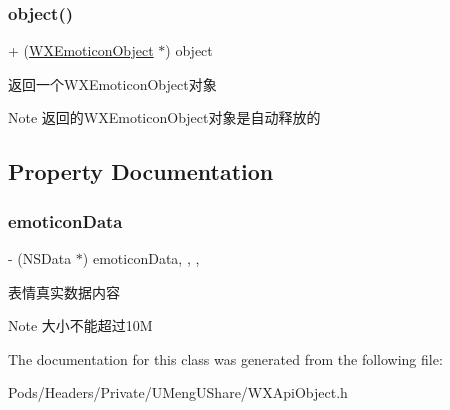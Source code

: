 \subsubsection{\texorpdfstring{object()}{object()}\hspace{0.1cm}{\footnotesize\ttfamily [3/3]}}
{\footnotesize\ttfamily + (\mbox{\hyperlink{interface_w_x_emoticon_object}{W\+X\+Emoticon\+Object}} $\ast$) object \begin{DoxyParamCaption}{ }\end{DoxyParamCaption}}



返回一个\+W\+X\+Emoticon\+Object对象 

\begin{DoxyNote}{Note}
返回的\+W\+X\+Emoticon\+Object对象是自动释放的 
\end{DoxyNote}


\subsection{Property Documentation}
\mbox{\label{interface_w_x_emoticon_object_a9a00b45ef65b19ff47a971b58123ace0}} 
\subsubsection{\texorpdfstring{emoticon\+Data}{emoticonData}}
{\footnotesize\ttfamily -\/ (N\+S\+Data $\ast$) emoticon\+Data\hspace{0.3cm}{\ttfamily [read]}, {\ttfamily [write]}, {\ttfamily [nonatomic]}, {\ttfamily [retain]}}

表情真实数据内容 \begin{DoxyNote}{Note}
大小不能超过10M 
\end{DoxyNote}


The documentation for this class was generated from the following file\+:\begin{DoxyCompactItemize}
\item 
Pods/\+Headers/\+Private/\+U\+Meng\+U\+Share/W\+X\+Api\+Object.\+h\end{DoxyCompactItemize}
